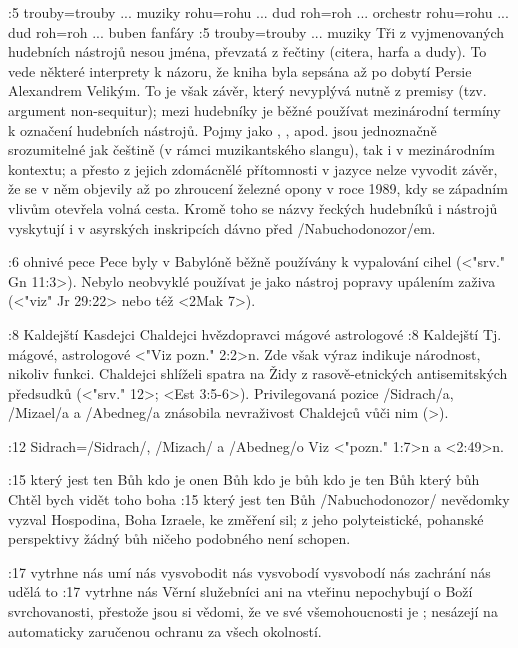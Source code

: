 :5  
    {trouby}={trouby ... muziky}  %
    {rohu}={rohu ... dud} %
    {roh}={roh ... orchestr}  %
    {rohu}={rohu ... dud} %
    {roh}={roh ... buben}  %
    {fanfáry}  %
:5 {trouby}={trouby ... muziky} Tři z vyjmenovaných  hudebních nástrojů  nesou jména, převzatá z řečtiny (citera, harfa a dudy). To vede některé interprety k názoru, že kniha byla sepsána až po dobytí Persie Alexandrem Velikým. 
To je však závěr, který nevyplývá nutně z premisy (tzv. argument non-sequitur); mezi hudebníky je běžné používat mezinárodní termíny k označení hudebních nástrojů. Pojmy jako  ,  ,  apod. jsou jednoznačně srozumitelné jak češtině (v rámci muzikantského slangu), tak i v mezinárodním kontextu; a přesto z jejich zdomácnělé přítomnosti v jazyce nelze vyvodit závěr, že se v něm objevily až po zhroucení železné opony v roce 1989, kdy se západním vlivům otevřela volná cesta. 
Kromě toho se názvy řeckých hudebníků i nástrojů vyskytují i v asyrských inskripcích dávno před \x/Nabuchodonozor/em. 

:6 {ohnivé pece} Pece byly v Babylóně běžně používány k vypalování cihel  (<"srv." Gn 11:3>). Nebylo neobvyklé používat je jako nástroj popravy upálením zaživa (<"viz" Jr 29:22> nebo též <2Mak 7>).  

:8
    {Kaldejští}  %
    {Kasdejci} %
    {Chaldejci}  %
    {hvězdopravci} %
    {mágové}  %
    {astrologové}  %
 :8 {Kaldejští} Tj. mágové, astrologové <"Viz pozn." 2:2>n.  %
 Zde však výraz  indikuje národnost, nikoliv funkci. Chaldejci shlíželi spatra na Židy z rasově-etnických antisemitských předsudků (<"srv." 12>; <Est 3:5-6>). Privilegovaná pozice \x/Sidrach/a, \x/Mizael/a a  \x/Abedneg/a znásobila nevraživost Chaldejců vůči nim (>).

:12 {Sidrach}={\x/Sidrach/, \x/Mizach/ a \x/Abedneg/o} Viz <"pozn." 1:7>n a <2:49>n. 

:15  
    {který jest ten Bůh}  %
    {kdo je onen Bůh} %
    {kdo je bůh}  %
    {kdo je ten Bůh} %
    {který bůh}  %
    {Chtěl bych vidět toho boha}  %
 :15 {který jest ten Bůh} \x/Nabuchodonozor/ nevědomky vyzval Hospodina, Boha Izraele, ke změření sil; z jeho polyteistické, pohanské perspektivy žádný bůh ničeho podobného není schopen.


:17
    {vytrhne nás}  %
    {umí nás vysvobodit} %
    {nás vysvobodí}  %
    {vysvobodí nás} %
    {zachrání nás}  %
    {udělá to}  %
 :17  {vytrhne nás} Věrní služebníci ani na vteřinu nepochybují o Boží svrchovanosti, přestože jsou si vědomi, že ve své všemohoucnosti je ; nesázejí na automaticky zaručenou ochranu za všech okolností. 



